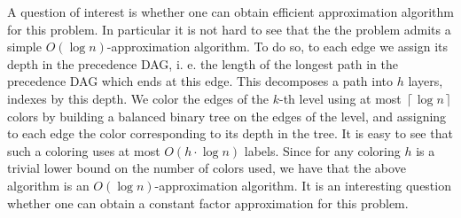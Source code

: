 \documentclass[a4paper,UKenglish,cleveref, autoref, thm-restate]{lipics-v2021}
\newcommand{\br}[1]{\mathopen{}\left( #1 \right)}
\newcommand{\cl}[1]{\mathopen{}\left\lceil #1 \right\rceil}
\begin{document}
A question of interest is whether one can obtain efficient approximation algorithm for this problem. In particular it is not hard to see that the the problem admits a simple $O\br{\log n}$-approximation algorithm. To do so, to each edge we assign its depth in the precedence DAG, i. e. the length of the longest path in the precedence DAG which ends at this edge. This decomposes a path into $h$ layers, indexes by this depth. We color the edges of the $k$-th level using at most $\cl{\log n}$ colors by building a balanced binary tree on the edges of the level, and assigning to each edge the color corresponding to its depth in the tree. It is easy to see that such a coloring uses at most $O\br{h\cdot\log n}$ labels. Since for any coloring $h$ is a trivial lower bound on the number of colors used, we have that the above algorithm is an $O\br{\log n}$-approximation algorithm. It is an interesting question whether one can obtain a constant factor approximation for this problem.



\end{document}
